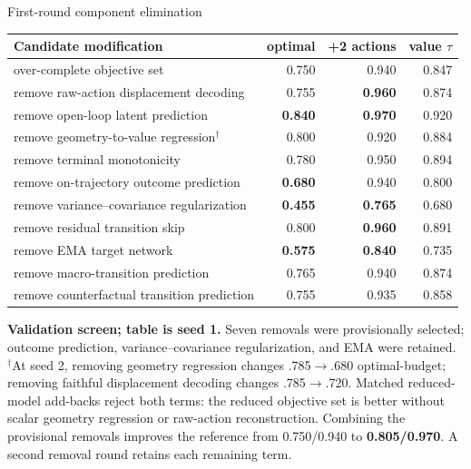\documentclass[aspectratio=169,10pt]{beamer}
\newcommand{\good}[1]{\textcolor{cgreen}{\textbf{#1}}}
\newcommand{\warn}[1]{\textcolor{corange}{\textbf{#1}}}
\newcommand{\bad}[1]{\textcolor{cred}{\textbf{#1}}}
\begin{document}
\begin{frame}{First-round component elimination}
\small
\centering
\begin{tabular}{lrrr}
\toprule
Candidate modification & optimal & +2 actions & value $\tau$\\
\midrule
over-complete objective set & 0.750 & 0.940 & 0.847\\
remove raw-action displacement decoding & 0.755 & \good{0.960} & 0.874\\
remove open-loop latent prediction & \good{0.840} & \good{0.970} & 0.920\\
remove geometry-to-value regression$^{\dagger}$ & 0.800 & 0.920 & 0.884\\
remove terminal monotonicity & 0.780 & 0.950 & 0.894\\
remove on-trajectory outcome prediction & \bad{0.680} & 0.940 & 0.800\\
remove variance--covariance regularization & \bad{0.455} & \bad{0.765} & 0.680\\
remove residual transition skip & 0.800 & \good{0.960} & 0.891\\
remove EMA target network & \bad{0.575} & \bad{0.840} & 0.735\\
remove macro-transition prediction & 0.765 & 0.940 & 0.874\\
remove counterfactual transition prediction & 0.755 & 0.935 & 0.858\\
\bottomrule
\end{tabular}

\medskip
\warn{Validation screen; table is seed 1.} Seven removals were provisionally
selected; outcome prediction, variance--covariance regularization, and EMA
were retained. $^{\dagger}$At
seed 2, removing geometry regression changes .785$\rightarrow$.680 optimal-budget;
removing faithful displacement decoding changes .785$\rightarrow$.720.
Matched reduced-model add-backs reject both terms: the reduced objective set is
better without scalar geometry regression or raw-action reconstruction.
Combining the provisional removals improves the reference from 0.750/0.940 to
\good{0.805/0.970}. A second removal round retains each remaining term.
\end{frame}
\end{document}
